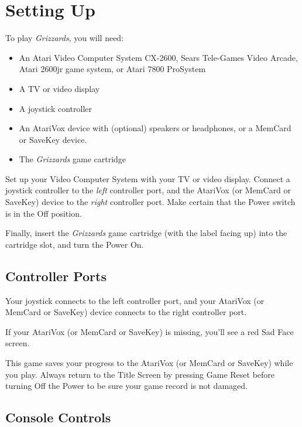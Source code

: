 \documentclass[12pt,twoside,openright,book]{memoir}
\begin{document}
\cleardoublepage

\tableofcontents

\chapter{Setting Up}\label{Setting Up}

To play \textit{Grizzards}, you will need:

\begin{itemize}
\item An  Atari Video  Computer System  CX-2600, Sears  Tele-Games Video
  Arcade, Atari 2600jr game system, or Atari 7800 ProSystem
\item A TV or video display
\item A joystick controller
\item  An AtariVox  device with  (optional) speakers  or headphones,  or
  a MemCard or SaveKey device.
\item The \textit{Grizzards} game cartridge
\end{itemize}

Set  up your  Video  Computer  System with  your  TV  or video  display.
Connect a  joystick controller to  the \emph{left} controller  port, and
the  AtariVox  (or  MemCard  or  SaveKey)  device  to  the  \emph{right}
controller  port.  Make  certain  that   the  Power  switch  is  in  the
Off position.

Finally, insert the \textit{Grizzards} game  cartridge (with the label facing up)
into the cartridge slot, and turn the Power On.

\section{Controller Ports}

Your joystick  connects to the  left controller port, and  your AtariVox
(or MemCard or SaveKey) device connects to the right controller port.

If your  AtariVox (or MemCard or  SaveKey) is missing, you'll  see a red
Sad Face screen.

This game  saves your progress to  the AtariVox (or MemCard  or SaveKey)
while you play. Always return to the Title Screen by pressing Game Reset
before turning Off the Power to be sure your game record is not damaged.

\section{Console Controls}
\end{document}
